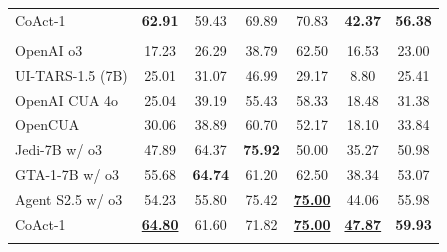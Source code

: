 \documentclass{article} %
\newcommand{\ours}{CoAct-1\xspace}
\newcommand{\best}[1]{\underline{#1}}
\begin{document}
\begin{table}[t]
{\begin{tabular}{lccccccccccc}
\ours                    & \multicolumn{3}{c}{\textbf{62.91}}  & \multicolumn{3}{c}{59.43} & \multicolumn{2}{c}{69.89}                 & 70.83          & \textbf{42.37}         & \textbf{56.38}                    \\\rowcolor{gray!15}
\multicolumn{12}{c}{\textit{100 步}}                                                                                                                                                                                                  \\
OpenAI o3                  & \multicolumn{3}{c}{17.23}           & \multicolumn{3}{c}{26.29}          & \multicolumn{2}{c}{38.79}                 & 62.50          & 16.53                  & 23.00                             \\
UI-TARS-1.5 (7B)             & \multicolumn{3}{c}{25.01}           & \multicolumn{3}{c}{31.07}          & \multicolumn{2}{c}{46.99}                 & 29.17          & 8.80                  & 25.41                            \\
OpenAI CUA 4o              & \multicolumn{3}{c}{25.04}           & \multicolumn{3}{c}{39.19}          & \multicolumn{2}{c}{55.43}                 & 58.33          & 18.48                  & 31.38                             \\
OpenCUA              & \multicolumn{3}{c}{30.06}           & \multicolumn{3}{c}{38.89}          & \multicolumn{2}{c}{60.70}                 & 52.17          & 18.10                  & 33.84                             \\
Jedi-7B w/ o3              & \multicolumn{3}{c}{47.89}           & \multicolumn{3}{c}{64.37}          & \multicolumn{2}{c}{\textbf{75.92}}        & 50.00          & 35.27                  & 50.98                             \\
GTA-1-7B w/ o3             & \multicolumn{3}{c}{55.68}           & \multicolumn{3}{c}{\textbf{64.74}} & \multicolumn{2}{c}{61.20}                 & 62.50          & 38.34                  & 53.07                             \\
Agent S2.5 w/ o3           & \multicolumn{3}{c}{54.23}           & \multicolumn{3}{c}{55.80}          & \multicolumn{2}{c}{75.42}                 & \textbf{\best{75.00}}          & 44.06                  & 55.98                             \\\rowcolor[HTML]{DBFCDA}
\ours                    & \multicolumn{3}{c}{\textbf{\best{64.80}}}  & \multicolumn{3}{c}{61.60}          & \multicolumn{2}{c}{71.82}                 & \textbf{\best{75.00}} & \textbf{\best{47.87}}         & \textbf{59.93}                             \\ \rowcolor{gray!15}

\end{tabular}}
\end{table}
\end{document}
